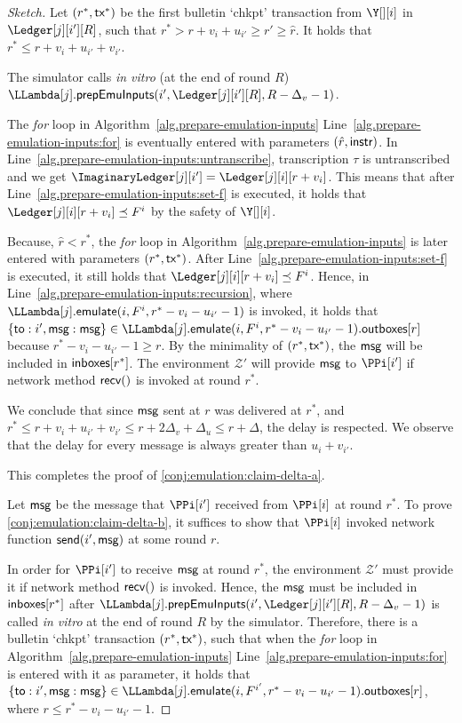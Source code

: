 \begin{proof}[Sketch]
  Let $(r^*, \textsf{tx}^*)$ be the first bulletin `chkpt' transaction from $\Y[][i]$ in $\Ledger[j][i'][R]$, such that
  $r^* > r + v_{i} + u_{i'} \geq r' \geq \hat{r}$. It holds that $r^* \leq r + v_{i} + u_{i'} + v_{i'}$.

  The simulator calls \emph{in vitro} (at the end of round $R$)
  $\LLambda[j].\prepareEmulationInputs(i', \Ledger[j][i'][R], R - \Delta_v - 1)$.

  The \emph{for} loop in Algorithm~\ref{alg.prepare-emulation-inputs}
  Line~\ref{alg.prepare-emulation-inputs:for} is eventually entered with
  parameters $(\hat{r}, \textsf{instr})$.
  In Line~\ref{alg.prepare-emulation-inputs:untranscribe}, transcription $\tau$
  is untranscribed and we get $\ImaginaryLedger[j][i'] = \Ledger[j][i][r + v_i]$.
  This means that after Line~\ref{alg.prepare-emulation-inputs:set-f} is executed,
  it holds that $\Ledger[j][i][r + v_i] \preceq F^i$ by the safety of $\Y[][i]$.

  Because, $\hat{r} < r^*$, the \emph{for} loop in Algorithm~\ref{alg.prepare-emulation-inputs}
  is later entered with parameters $(r^*, \textsf{tx}^*)$.
  After Line~\ref{alg.prepare-emulation-inputs:set-f} is executed,
  it still holds that $\Ledger[j][i][r + v_i] \preceq F^i$.
  Hence, in Line~\ref{alg.prepare-emulation-inputs:recursion}, where
  $\LLambda[j].\emulate(i, F^i, r^* - v_i - u_{i'} - 1)$ is invoked, it holds that
  $\{\textsf{to}: i', \msg: \msg\} \in \LLambda[j].\emulate(i, F^i, r^* - v_i - u_{i'} - 1).\outboxes[r]$
  because $r^* - v_i - u_{i'} - 1 \geq r$.
  By the minimality of $(r^*, \textsf{tx}^*)$, the $\textsf{msg}$ will be included in $\textsf{inboxes}[r^*]$.
  The environment $\mathcal{Z}'$ will provide $\textsf{msg}$ to $\PPi[i']$
  if network method $\textsf{recv}()$ is invoked at round $r^*$.

  We conclude that since $\textsf{msg}$ sent at $r$ was delivered at $r^*$,
  and $r^* \leq r + v_{i} + u_{i'} + v_{i'} \leq r + 2 \Delta_v + \Delta_u \leq r + \Delta$, the
  delay is respected. We observe that the delay for every message is always
  greater than $u_i + v_{i'}$.

  This completes the proof of \ref{conj:emulation:claim-delta-a}.

  Let $\textsf{msg}$ be the message that $\PPi[i']$ received from $\PPi[i]$ at round $r^*$.
  To prove \ref{conj:emulation:claim-delta-b}, it suffices to show that
  $\PPi[i]$ invoked network function $\textsf{send}(i', \textsf{msg})$ at some round $r$.

  In order for $\PPi[i']$ to receive $\textsf{msg}$ at round $r^*$,
  the environment $\mathcal{Z}'$ must provide it if network method $\textsf{recv}()$ is invoked.
  Hence, the $\textsf{msg}$ must be included in $\textsf{inboxes}[r^*]$ after $\LLambda[j].\prepareEmulationInputs(i', \Ledger[j][i'][R], R - \Delta_v - 1)$
  is called \emph{in vitro} at the end of round $R$ by the simulator.
  Therefore, there is a bulletin `chkpt' transaction $(r^*, \textsf{tx}^*)$, such that
  when the \emph{for} loop in Algorithm~\ref{alg.prepare-emulation-inputs} Line~\ref{alg.prepare-emulation-inputs:for}
  is entered with it as parameter, it holds that
  $\{\textsf{to}: i', \msg: \msg\} \in \LLambda[j].\emulate(i, F^{i'}, r^* - v_i - u_{i'} - 1).\outboxes[r]$,
  where $r \leq r^* - v_i - u_{i'} - 1$.


\end{proof}
